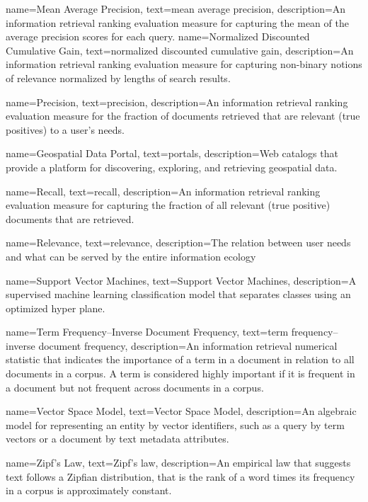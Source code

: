 {
    name=Mean Average Precision,
    text=mean average precision,
    description=An information retrieval ranking evaluation measure for capturing the mean of the average precision scores for each query.
}
{
    name=Normalized Discounted Cumulative Gain,
    text=normalized discounted cumulative gain,
    description=An information retrieval ranking evaluation measure for capturing non-binary notions of relevance normalized by lengths of search results.
}

{
    name=Precision,
    text=precision,
    description=An information retrieval ranking evaluation measure for the fraction of documents retrieved that are relevant (true positives) to a user's needs.
}

{
    name=Geospatial Data Portal,
    text=portals,
    description=Web catalogs that provide a platform for discovering, exploring, and retrieving geospatial data.
}

{
    name=Recall,
    text=recall,
    description=An information retrieval ranking evaluation measure for capturing the fraction of all relevant (true positive) documents that are retrieved.
}

{
    name=Relevance,
    text=relevance,
    description=The relation between user needs and what can be served by  the  entire  information  ecology \cite{Hjorland2010}
}

{
    name=Support Vector Machines,
    text=Support Vector Machines,
    description=A supervised machine learning classification model that separates classes using an optimized hyper plane.
}

{
    name=Term Frequency–Inverse Document Frequency,
    text=term frequency–inverse document frequency,
    description=An information retrieval numerical statistic that indicates the importance of a term in a document in relation to all documents in a corpus. A term is considered highly important if it is frequent in a document but not frequent across documents in a corpus.
}

{
    name=Vector Space Model,
    text=Vector Space Model,
    description=An algebraic model for representing an entity by vector identifiers, such as a query by term vectors or a document by text metadata attributes. 
}

{
    name=Zipf's Law,
    text=Zipf's law,
    description=An empirical law that suggests text follows a Zipfian distribution, that is the rank of a word times its frequency in a corpus is approximately constant.
}